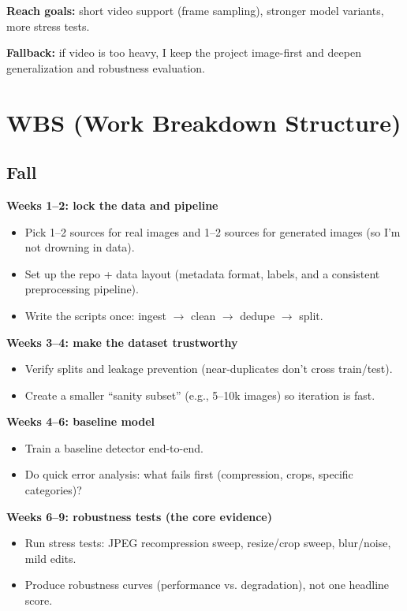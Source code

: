 \documentclass[11pt]{article}
\begin{document}
\textbf{Reach goals:} short video support (frame sampling), stronger model variants, more stress tests.

\textbf{Fallback:} if video is too heavy, I keep the project image-first and deepen generalization and robustness evaluation.

\section{WBS (Work Breakdown Structure)}

\subsection{Fall}

\textbf{Weeks 1--2: lock the data and pipeline}
\begin{itemize}[leftmargin=1.4em, itemsep=0pt]
  \item Pick 1--2 sources for real images and 1--2 sources for generated images (so I’m not drowning in data).
  \item Set up the repo + data layout (metadata format, labels, and a consistent preprocessing pipeline).
  \item Write the scripts once: ingest $\rightarrow$ clean $\rightarrow$ dedupe $\rightarrow$ split.
\end{itemize}

\textbf{Weeks 3--4: make the dataset trustworthy}
\begin{itemize}[leftmargin=1.4em, itemsep=0pt]
  \item Verify splits and leakage prevention (near-duplicates don’t cross train/test).
  \item Create a smaller ``sanity subset'' (e.g., 5--10k images) so iteration is fast.
\end{itemize}

\textbf{Weeks 4--6: baseline model}
\begin{itemize}[leftmargin=1.4em, itemsep=0pt]
  \item Train a baseline detector end-to-end.
  \item Do quick error analysis: what fails first (compression, crops, specific categories)?
\end{itemize}

\textbf{Weeks 6--9: robustness tests (the core evidence)}
\begin{itemize}[leftmargin=1.4em, itemsep=0pt]
  \item Run stress tests: JPEG recompression sweep, resize/crop sweep, blur/noise, mild edits.
  \item Produce robustness curves (performance vs. degradation), not one headline score.
\end{itemize}
\end{document}
